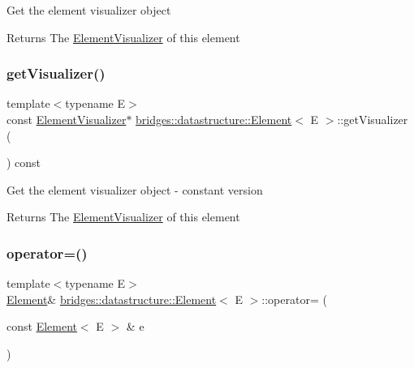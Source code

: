 Get the element visualizer object \begin{DoxyReturn}{Returns}
The \hyperlink{classbridges_1_1datastructure_1_1_element_visualizer}{Element\+Visualizer} of this element 
\end{DoxyReturn}
\mbox{\label{classbridges_1_1datastructure_1_1_element_a75a7770c3b6b1a6cd826293ea33d2d0a}} 
\subsubsection{\texorpdfstring{get\+Visualizer()}{getVisualizer()}\hspace{0.1cm}{\footnotesize\ttfamily [2/2]}}
{\footnotesize\ttfamily template$<$typename E$>$ \\
const \hyperlink{classbridges_1_1datastructure_1_1_element_visualizer}{Element\+Visualizer}$\ast$ \hyperlink{classbridges_1_1datastructure_1_1_element}{bridges\+::datastructure\+::\+Element}$<$ E $>$\+::get\+Visualizer (\begin{DoxyParamCaption}{ }\end{DoxyParamCaption}) const\hspace{0.3cm}{\ttfamily [inline]}}

Get the element visualizer object -\/ constant version

\begin{DoxyReturn}{Returns}
The \hyperlink{classbridges_1_1datastructure_1_1_element_visualizer}{Element\+Visualizer} of this element 
\end{DoxyReturn}
\mbox{\label{classbridges_1_1datastructure_1_1_element_a6446ad27ba42a854ff93b74b4d7eb3cb}} 
\subsubsection{\texorpdfstring{operator=()}{operator=()}\hspace{0.1cm}{\footnotesize\ttfamily [1/2]}}
{\footnotesize\ttfamily template$<$typename E$>$ \\
\hyperlink{classbridges_1_1datastructure_1_1_element}{Element}\& \hyperlink{classbridges_1_1datastructure_1_1_element}{bridges\+::datastructure\+::\+Element}$<$ E $>$\+::operator= (\begin{DoxyParamCaption}\item[{const \hyperlink{classbridges_1_1datastructure_1_1_element}{Element}$<$ E $>$ \&}]{e }\end{DoxyParamCaption})\hspace{0.3cm}{\ttfamily [inline]}}


